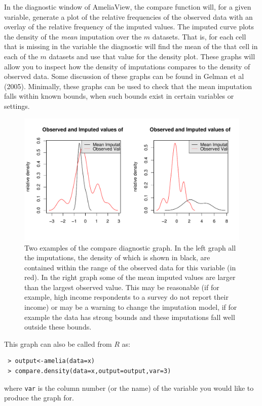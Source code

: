\documentclass[12pt,titlepage]{article}
\begin{document}
In the diagnostic window of AmeliaView, the compare function will, for
a given variable, generate a plot of the relative frequencies of the
observed data with an overlay of the relative frequency of the imputed
values.  The imputed curve plots the density of the \emph{mean}
imputation over the $m$ datasets.  That is, for each cell that is
missing in the variable the diagnostic will find the mean of the that
cell in each of the $m$ datasets and use that value for the density
plot.  These graphs will allow you to inspect how the density of
imputations compares to the density of observed data. Some discussion
of these graphs can be found in Gelman et al (2005).  Minimally, these
graphs can be used to check that the mean imputation falls within
known bounds, when such bounds exist in certain variables or settings.
\begin{figure}[htp!]
  \centering \includegraphics[scale=.8]{comp}
  \caption{Two examples of the compare diagnostic graph.  In the left
    graph all the imputations, the density of which is shown in black,
    are contained within the range of the observed data for this
    variable (in red).  In the right graph some of the mean imputed
    values are larger than the largest observed value.  This may be
    reasonable (if for example, high income respondents to a survey do
    not report their income) or may be a warning to change the
    imputation model, if for example the data has strong bounds and
    these imputations fall well outside these bounds.}
  \label{f:oi1}
\end{figure}


This graph can also be called from $R$ as:
\begin{verbatim}
 > output<-amelia(data=x) 
 > compare.density(data=x,output=output,var=3)
\end{verbatim}
where \texttt{var} is the column number (or the name) of the variable
you would like to produce the graph for.
\end{document}
